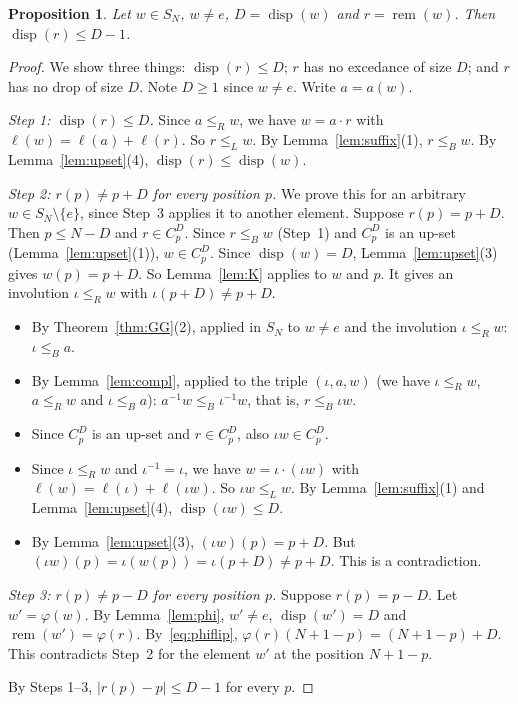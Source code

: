 \documentclass[11pt]{amsart}
\newtheorem{proposition}[theorem]{Proposition}
\theoremstyle{definition}
\theoremstyle{remark}
\numberwithin{equation}{section}
\newcommand{\leR}{\le_R}
\newcommand{\leL}{\le_L}
\newcommand{\leB}{\le_B}
\newcommand{\abs}[1]{\lvert #1\rvert}
\DeclareMathOperator{\rem}{rem}
\DeclareMathOperator{\disp}{disp}
\begin{document}
\begin{proposition}\label{prop:drop}
Let \(w\in S_N\), \(w\neq e\), \(D=\disp(w)\) and \(r=\rem(w)\). Then \(\disp(r)\le D-1\).
\end{proposition}

\begin{proof}
We show three things: \(\disp(r)\le D\); \(r\) has no excedance of size \(D\); and \(r\) has no drop of size \(D\). Note \(D\ge1\) since \(w\neq e\). Write \(a=a(w)\).

\emph{Step 1: \(\disp(r)\le D\).} Since \(a\leR w\), we have \(w=a\cdot r\) with \(\ell(w)=\ell(a)+\ell(r)\). So \(r\leL w\). By Lemma~\ref{lem:suffix}(1), \(r\leB w\). By Lemma~\ref{lem:upset}(4), \(\disp(r)\le\disp(w)\).

\emph{Step 2: \(r(p)\neq p+D\) for every position \(p\).} We prove this for an arbitrary \(w\in S_N\setminus\{e\}\), since Step~3 applies it to another element. Suppose \(r(p)=p+D\). Then \(p\le N-D\) and \(r\in C_p^D\). Since \(r\leB w\) (Step~1) and \(C_p^D\) is an up-set (Lemma~\ref{lem:upset}(1)), \(w\in C_p^D\). Since \(\disp(w)=D\), Lemma~\ref{lem:upset}(3) gives \(w(p)=p+D\). So Lemma~\ref{lem:K} applies to \(w\) and \(p\). It gives an involution \(\iota\leR w\) with \(\iota(p+D)\neq p+D\).
\begin{itemize}
\item By Theorem~\ref{thm:GG}(2), applied in \(S_N\) to \(w\neq e\) and the involution \(\iota\leR w\): \(\iota\leB a\).
\item By Lemma~\ref{lem:compl}, applied to the triple \((\iota,a,w)\) (we have \(\iota\leR w\), \(a\leR w\) and \(\iota\leB a\)): \(a^{-1}w\leB\iota^{-1}w\), that is, \(r\leB\iota w\).
\item Since \(C_p^D\) is an up-set and \(r\in C_p^D\), also \(\iota w\in C_p^D\).
\item Since \(\iota\leR w\) and \(\iota^{-1}=\iota\), we have \(w=\iota\cdot(\iota w)\) with \(\ell(w)=\ell(\iota)+\ell(\iota w)\). So \(\iota w\leL w\). By Lemma~\ref{lem:suffix}(1) and Lemma~\ref{lem:upset}(4), \(\disp(\iota w)\le D\).
\item By Lemma~\ref{lem:upset}(3), \((\iota w)(p)=p+D\). But \((\iota w)(p)=\iota(w(p))=\iota(p+D)\neq p+D\). This is a contradiction.
\end{itemize}

\emph{Step 3: \(r(p)\neq p-D\) for every position \(p\).} Suppose \(r(p)=p-D\). Let \(w'=\varphi(w)\). By Lemma~\ref{lem:phi}, \(w'\neq e\), \(\disp(w')=D\) and \(\rem(w')=\varphi(r)\). By~\eqref{eq:phiflip}, \(\varphi(r)(N+1-p)=(N+1-p)+D\). This contradicts Step~2 for the element \(w'\) at the position \(N+1-p\).

By Steps 1--3, \(\abs{r(p)-p}\le D-1\) for every \(p\).
\end{proof}
\end{document}
